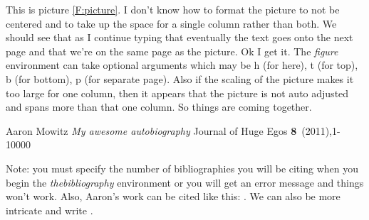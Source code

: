 \documentclass[twocolumn]{article} %
\begin{document}
This is picture \ref{F:picture}. I don't know how to format the picture to not be centered and to take up the space for a single column rather than both. We should see that as I continue typing that eventually the text goes onto the next page and that we're on the same page as the picture. Ok I get it. The \emph{figure} environment can take optional arguments which may be h (for here), t (for top), b (for bottom), p (for separate page). Also if the scaling of the picture makes it too large for one column, then it appears that the picture is not auto adjusted and spans more than that one column. So things are coming together. 

\begin{thebibliography}{9}
   Aaron Mowitz
   \emph{My awesome autobiography}
   Journal of Huge Egos
   \textbf{8}~(2011),1-10000
\end{thebibliography}

Note: you must specify the number of bibliographies you will be citing when you begin the \emph{thebibliography} environment or you will get an error message and things won't work. Also, Aaron's work can be cited like this: \cite{aM11}. We can also be more intricate and write \cite[pages~2--30 more text]{aM11}. 
\end{document}
